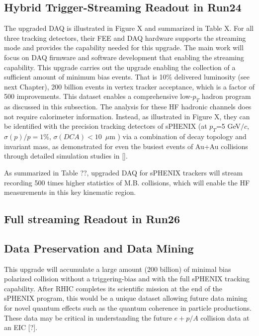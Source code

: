  
\subsection{Hybrid Trigger-Streaming Readout in Run24}
 
 The upgraded DAQ is illustrated in Figure X and summarized in Table X. For all three tracking detectors, their FEE and DAQ hardware supports the streaming mode and provides the capability needed for this upgrade. The main work will focus on DAQ firmware and software development that enabling the streaming capability. 
This upgrade carries out the upgrade enabling the collection of a sufficient amount of minimum bias \pp events. That is 10\% delivered luminosity (see next Chapter), 200 billion events in vertex tracker acceptance, which is a factor of 500 improvements. This dataset enables a comprehensive low-$p_T$ hadron program as discussed in this subsection. The analysis for these HF hadronic channels does not require calorimeter information. Instead, as illustrated in Figure X, they can be identified with the precision tracking detectors of sPHENIX (at $p_T$=5 GeV$/c$, $\sigma(p)/p=1\%$, $\sigma(DCA)<10$~$\mu$m ) via a combination of decay topology and invariant mass, as demonstrated for even the busiest events of Au+Au collisions through detailed simulation studies in []. 

 

 As summarized in Table ??, upgraded DAQ for sPHENIX trackers will stream recording 500 times higher statistics of M.B. \pp collisions, which will enable the HF measurements in this key kinematic region.


\subsection{Full streaming Readout in Run26}
 

\subsection{Data Preservation and Data Mining}

This upgrade will accumulate a large amount (200 billion) of minimal bias polarized \pp collision without a triggering-bias and with the full sPHENIX tracking capability. After RHIC completes its scientific mission at the end of the sPHENIX program, this would be a unique dataset allowing future data mining for novel quantum effects such as the quantum coherence in particle productions. These \pp data may be critical in understanding the future $e+p/A$ collision data at an EIC [?]. 
